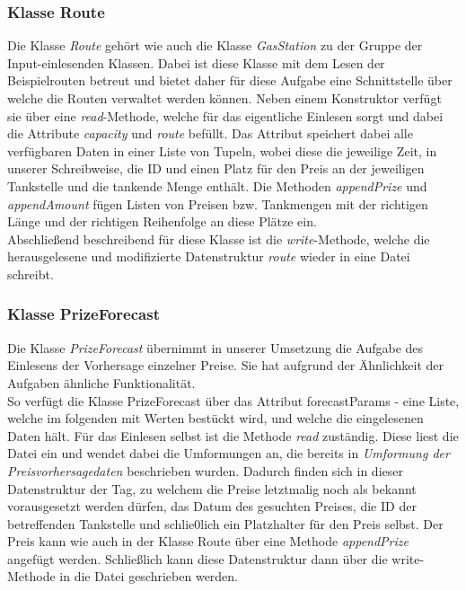 \documentclass[11pt]{article}
\begin{document}
\subsubsection{Klasse Route}
	Die Klasse \textit{Route} gehört wie auch die Klasse \textit{GasStation} zu der Gruppe der Input-einlesenden Klassen. Dabei ist diese Klasse mit dem Lesen der Beispielrouten betreut und bietet daher für diese Aufgabe eine Schnittstelle über welche die Routen verwaltet werden können. Neben einem Konstruktor verfügt sie über eine \textit{read}-Methode, welche für das eigentliche Einlesen sorgt und dabei die Attribute \textit{capacity} und \textit{route} befüllt. Das Attribut speichert dabei alle verfügbaren Daten in einer Liste von Tupeln, wobei diese die jeweilige Zeit, in unserer Schreibweise, die ID und einen Platz für den Preis an der jeweiligen Tankstelle und die tankende Menge enthält. Die Methoden \textit{appendPrize} und \textit{appendAmount} fügen Listen von Preisen bzw. Tankmengen mit der richtigen Länge und der richtigen Reihenfolge an diese Plätze ein. \\
	Abschließend beschreibend für diese Klasse ist die \textit{write}-Methode, welche die herausgelesene und modifizierte Datenstruktur \textit{route} wieder in eine Datei schreibt.
\subsubsection{Klasse PrizeForecast}
	Die Klasse \textit{PrizeForecast} übernimmt in unserer Umsetzung die Aufgabe des Einlesens der Vorhersage einzelner Preise. Sie hat aufgrund der Ähnlichkeit der Aufgaben ähnliche Funktionalität.\\ So verfügt die Klasse PrizeForecast über das Attribut forecastParams - eine Liste, welche im folgenden mit Werten bestückt wird, und welche die eingelesenen Daten hält. Für das Einlesen selbst ist die Methode \textit{read} zuständig. Diese liest die Datei ein und wendet dabei die Umformungen an, die bereits in \textit{Umformung der Preisvorhersagedaten} beschrieben wurden. Dadurch finden sich in dieser Datenstruktur der Tag, zu welchem die Preise letztmalig noch als bekannt vorausgesetzt werden dürfen, das Datum des gesuchten Preises, die ID der betreffenden Tankstelle und schlie0lich ein Platzhalter für den Preis selbst. Der Preis kann wie auch in der Klasse Route über eine Methode \textit{appendPrize} angefügt werden. Schließlich kann diese Datenstruktur dann über die write-Methode in die Datei geschrieben werden.
\end{document}
